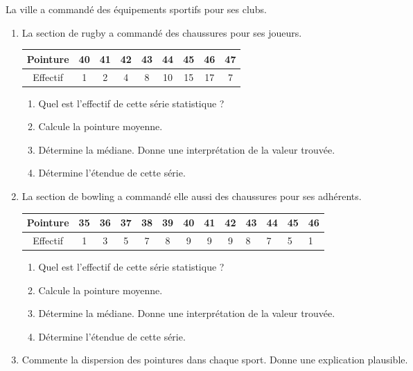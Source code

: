 
La ville a commandé des équipements sportifs pour ses clubs.

\begin{enumerate}
\item La section de rugby a commandé des chaussures pour ses joueurs.

\begin{tabular}{|c|c|c|c|c|c|c|c|c|}
\hline 
\hline 
Pointure&40 & 41 & 42 & 43 & 44 & 45 & 46 & 47  \\ 
\hline 
Effectif &1 & 2 & 4 & 8 & 10 & 15 & 17 & 7  \\ 
\hline 
\end{tabular} 

\begin{enumerate}
\item Quel est l'effectif de cette série statistique ?
\item Calcule la pointure moyenne.
\item Détermine la médiane. Donne une interprétation de la valeur trouvée.
\item Détermine l'étendue de cette série.
\end{enumerate}

\item La section de bowling a commandé elle aussi des chaussures pour ses adhérents.

\begin{tabular}{|c|c|c|c|c|c|c|c|c|}
\hline 
\hline 
Pointure&35&36 & 37 & 38 & 39 & 40 & 41 & 42 & 43 & 44 & 45 & 46   \\ 
\hline 
Effectif&1 &3 & 5 & 7 & 8 &9 & 9 & 9 & 8 & 7 & 5 & 1   \\ 
\hline 
\end{tabular} 

\begin{enumerate}
\item Quel est l'effectif de cette série statistique ?
\item Calcule la pointure moyenne.
\item Détermine la médiane. Donne une interprétation de la valeur trouvée.
\item Détermine l'étendue de cette série.
\end{enumerate}

\item Commente la dispersion des pointures dans chaque sport. Donne une explication plausible.

\end{enumerate}
